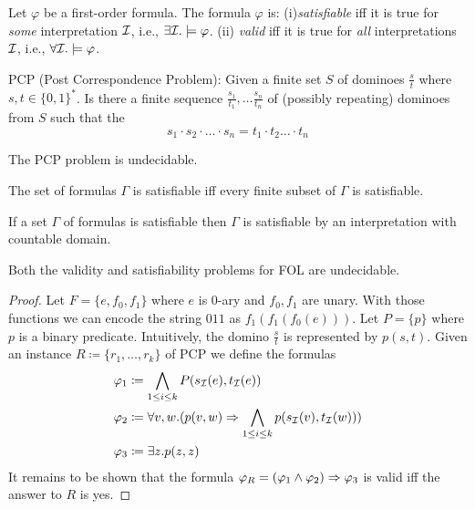 \begin{definition}
    Let $\varphi$ be a first-order formula. The formula $\varphi$ is: 
     (i)\emph{satisfiable} iff it is true for \emph{some} interpretation $\mathcal{I}$, i.e., $\exists \mathcal{I} . \models \varphi$.
    (ii) \emph{valid} iff it is true for \emph{all} interpretations $\mathcal{I}$, i.e., $\forall \mathcal{I} . \models \varphi$.
\end{definition}


\begin{definition}
    PCP (Post Correspondence Problem): Given a finite set $S$ of dominoes $\frac{s}{t}$ where $s,t \in \{0,1\}^*$. Is there a finite sequence $\frac{s_1}{t_1}, \dots \frac{s_n}{t_n}$ of (possibly repeating) dominoes from $S$ such that the 
$$s_1 \cdot s_2 \cdot \dots \cdot s_n = t_1 \cdot t_2 \dots \cdot t_n$$
\end{definition}

\begin{theorem}
    The PCP problem is undecidable.
\end{theorem}


\begin{theorem}[Compactness] 
The set of formulas $\Gamma$ is satisfiable iff every finite subset of $\Gamma$ is satisfiable.
\end{theorem}


\begin{theorem} 
If a set $\Gamma$ of formulas is satisfiable then $\Gamma$ is satisfiable by an interpretation with countable domain. 
\end{theorem}


\begin{theorem}[Undecidability]
    Both the validity and satisfiability problems for FOL are undecidable.
\end{theorem}
\begin{proof}
   Let $F = \{e,f_0, f_1\}$ where $e$ is 0-ary and $f_0,f_1$ are unary. With those functions we can encode the string $011$ as $f_1(f_1(f_0(e)))$.  
    Let $P = \{p\}$ where $p$ is a binary predicate. Intuitively, the domino $\frac{s}{t}$ is represented by $p(s,t)$. 
    Given an instance $R\coloneqq \{r_1, \dots, r_k\}$ of PCP we define the formulas
    \begin{align*}
        \varphi_1 &\coloneqq \bigwedge_{1 \leq i \leq k} P(s_{\mathcal{I}}(e), t_{\mathcal{I}}(e)) \\
        \varphi_2 &\coloneqq \forall v,w. (p(v,w) \Rightarrow \bigwedge_{1 \leq i \leq k} p(s_{\mathcal{I}}(v), t_{\mathcal{I}}(w))) \\ 
        \varphi_3 &\coloneqq \exists z. p(z,z)
    \end{align*}
    It remains to be shown that the formula $\varphi_R = (\varphi_1 \land \varphi_2) \Rightarrow \varphi_3$ is valid iff the answer to $R$ is yes.
\end{proof}


